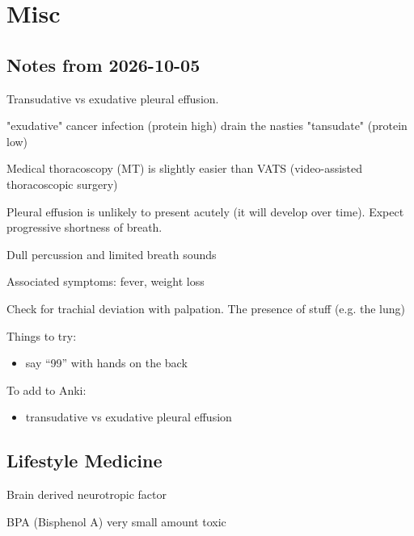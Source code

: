 \chapter{Misc}

\section{Notes from 2026-10-05}

Transudative vs exudative pleural effusion. 

"exudative" cancer infection (protein high) drain the nasties
"tansudate" (protein low)


Medical thoracoscopy (MT) is slightly easier than VATS (video-assisted thoracoscopic surgery) 


Pleural effusion is unlikely to present acutely (it will develop over time). Expect progressive shortness of breath. 

Dull percussion and limited breath sounds

Associated symptoms: fever, weight loss


Check for trachial deviation with palpation. The presence of stuff (e.g. the lung) 

Things to try:

\begin{itemize}
    \item say ``99'' with hands on the back
\end{itemize}

To add to Anki:

\begin{itemize}
    \item transudative vs exudative pleural effusion
\end{itemize}


\section{Lifestyle Medicine}


Brain derived neurotropic factor

BPA (Bisphenol A)
very small amount toxic


